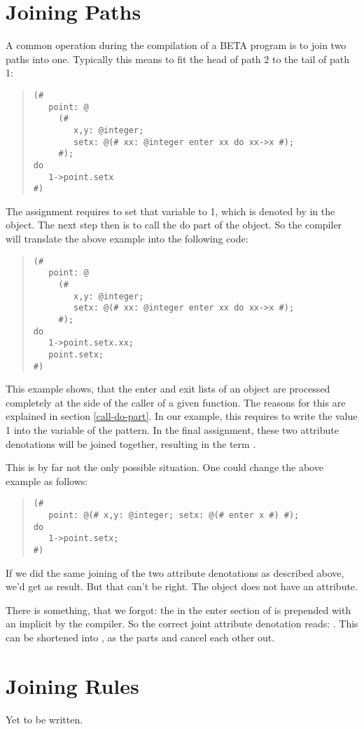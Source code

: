\section{Joining Paths}
A common operation during the compilation of a BETA program is to
join two paths into one.  Typically this means to fit the head of
path 2 to the tail of path 1:
\begin{quote}\begin{verbatim}(#
   point: @
     (#
        x,y: @integer;
        setx: @(# xx: @integer enter xx do xx->x #);
     #);
do
   1->point.setx
#)
\end{verbatim}\end{quote}
The assignment  requires to set that variable
to 1, which is denoted by  in the 
object.  The next step then is to call the do part of the
 object.  So the compiler will translate the
above example into the following code:
\begin{quote}\begin{verbatim}(#
   point: @
     (#
        x,y: @integer;
        setx: @(# xx: @integer enter xx do xx->x #);
     #);
do
   1->point.setx.xx;
   point.setx;
#)
\end{verbatim}\end{quote}
This example shows, that the enter and exit lists of an object
are processed completely at the side of the caller of a given
function.  The reasons for this are explained in section
\ref{call-do-part}.  In our example, this requires to write the
value 1 into the  variable of the  pattern.
In the final assignment, these two attribute denotations will be
joined together, resulting in the term .

This is by far not the only possible situation.  One could change
the above example as follows:
\begin{quote}\begin{verbatim}(#
   point: @(# x,y: @integer; setx: @(# enter x #) #);
do
   1->point.setx;
#)
\end{verbatim}\end{quote}
If we did the same joining of the two attribute denotations as
described above, we'd get  as result.  But that
can't be right.  The  object does not have an 
attribute.

There is something, that we forgot: the  in the enter
section of  is prepended with an implicit
 by the compiler.  So the correct joint attribute
denotation reads: .  This can be
shortened into , as the parts  and
 cancel each other out.

\section{Joining Rules}
Yet to be written.
